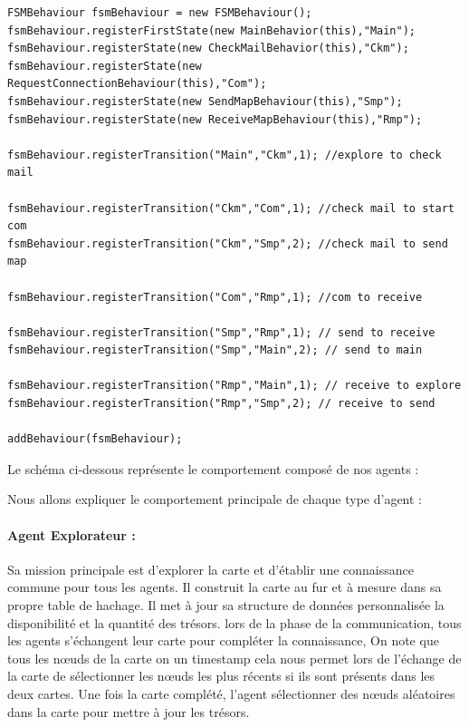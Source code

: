 \documentclass[10pt]{article}
\begin{document}
\begin{lstlisting}
FSMBehaviour fsmBehaviour = new FSMBehaviour();
fsmBehaviour.registerFirstState(new MainBehavior(this),"Main");
fsmBehaviour.registerState(new CheckMailBehavior(this),"Ckm");
fsmBehaviour.registerState(new RequestConnectionBehaviour(this),"Com");
fsmBehaviour.registerState(new SendMapBehaviour(this),"Smp");
fsmBehaviour.registerState(new ReceiveMapBehaviour(this),"Rmp");

fsmBehaviour.registerTransition("Main","Ckm",1); //explore to check mail

fsmBehaviour.registerTransition("Ckm","Com",1); //check mail to start com
fsmBehaviour.registerTransition("Ckm","Smp",2); //check mail to send map

fsmBehaviour.registerTransition("Com","Rmp",1); //com to receive

fsmBehaviour.registerTransition("Smp","Rmp",1); // send to receive
fsmBehaviour.registerTransition("Smp","Main",2); // send to main

fsmBehaviour.registerTransition("Rmp","Main",1); // receive to explore
fsmBehaviour.registerTransition("Rmp","Smp",2); // receive to send

addBehaviour(fsmBehaviour);
\end{lstlisting}
Le schéma ci-dessous représente le comportement composé de nos agents :

Nous allons expliquer le comportement principale de chaque type d'agent :
\paragraph{Agent Explorateur :}
Sa mission principale est d'explorer la carte et d'établir une connaissance commune pour tous les agents. Il construit la carte au fur et à mesure dans sa propre table de hachage. Il met à jour sa structure de données personnalisée la disponibilité et la quantité des trésors. lors de la phase de la communication, tous les agents s'échangent leur carte pour compléter la connaissance, On note que tous les nœuds de la carte on un timestamp cela nous permet lors de l'échange de la carte de sélectionner les nœuds les plus récents si ils sont présents dans les deux cartes. Une fois la carte complété, l'agent sélectionner des nœuds aléatoires dans la carte pour mettre à jour les trésors.
\end{document}
